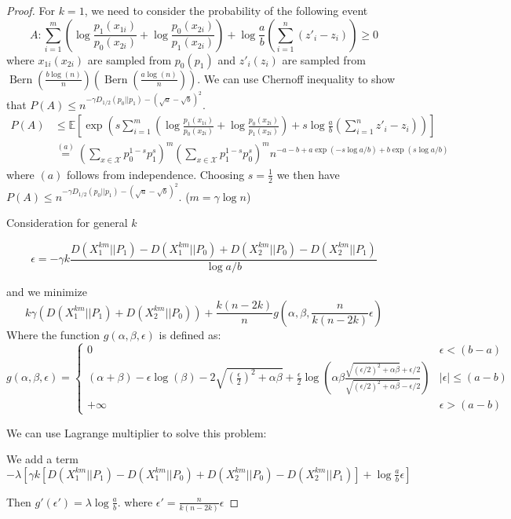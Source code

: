 \documentclass{article}
\DeclareMathOperator{\Bern}{Bern}
\newcommand{\A}{\frac{a \log(n)}{n}}
\newcommand{\B}{\frac{b \log(n)}{n}}
\begin{document}
\begin{proof}
	For $k=1$, we need to consider the probability of the following event 
	$$
	A: \sum_{i=1}^m \left( \log \frac{p_1(x_{1i})}{p_0(x_{2i})}
	+ \log \frac{p_0(x_{2i})}{p_1(x_{2i})} \right) + \log \frac{a}{b}(\sum_{i=1}^n (z'_i - z_i)) \geq 0
	$$
	where $x_{1i}(x_{2i})$ are sampled from $p_0(p_1)$ and $z'_i(z_i)$ are sampled from $\Bern(\B) (\Bern(\A))$.
	We can use Chernoff inequality to show that $P(A) \leq n^{-\gamma D_{1/2}(p_0||p_1)-(\sqrt{a}-\sqrt{b})^2}$.
	\begin{align*}
	P(A) &\leq \mathbb{E}[\exp( s\sum_{i=1}^m \left( \log \frac{p_1(x_{1i})}{p_0(x_{2i})}
	+ \log \frac{p_0(x_{2i})}{p_1(x_{2i})} \right) + s\log \frac{a}{b}(\sum_{i=1}^n z'_i - z_i) )] \\
	& \stackrel{(a)}{=} (\sum_{x\in \mathcal{X}} p_0^{1-s}p_1^{s})^m (\sum_{x\in \mathcal{X}} p_1^{1-s}p_0^{s})^m
	n^{-a-b+a\exp(-s\log a/b)+b\exp(s\log a/b)}
	\end{align*}
	where $(a)$ follows from independence. Choosing $s=\frac{1}{2}$ we then have 
	$P(A) \leq n^{-\gamma D_{1/2}(p_0||p_1)-(\sqrt{a}-\sqrt{b})^2}$. ($m=\gamma \log n$)
		
	Consideration for general $k$
	
	$$
	\epsilon = -\gamma k\frac{D(X_1^{km} || P_1) - D(X_1^{km} || P_0) + D(X_2^{km} || P_0) - D(X_2^{km} || P_1)}{\log a /b}
	$$
	
	and we minimize
	$$
	k\gamma (D(X_1^{km}||P_1) + D(X_2^{km}||P_0)) + \frac{k(n-2k)}{n} g(\alpha, \beta, \frac{n}{k(n-2k)}\epsilon)
	$$
	Where the function $g(\alpha, \beta, \epsilon)$ is defined as:
	$$
	g(\alpha, \beta, \epsilon) = \begin{cases}
	0 & \epsilon < (b-a) \\
	(\alpha+\beta)-\epsilon \log(\beta) - 2\sqrt{\left( \frac{\epsilon}{2}\right)^2 +\alpha \beta} +\frac{\epsilon}{2} \log \left( \alpha \beta \frac{\sqrt{(\epsilon/2)^2 +\alpha \beta} +\epsilon/2}{\sqrt{(\epsilon/2)^2 +\alpha \beta} -\epsilon/2} \right)& |\epsilon| \leq(a-b) \\
	+\infty & \epsilon > (a-b)
	\end{cases}
	$$
	
	We can use Lagrange multiplier to solve this problem:
	
	We add a term $-\lambda[ \gamma k[D(X_1^{km} || P_1) - D(X_1^{km} || P_0) + D(X_2^{km} || P_0) - D(X_2^{km} || P_1)]+ \log\frac{a}{b}\epsilon]$
	
	Then $g'(\epsilon') = \lambda \log\frac{a}{b}$. where $\epsilon' = \frac{n}{k(n-2k)}\epsilon$
	

\end{proof}
\end{document}
